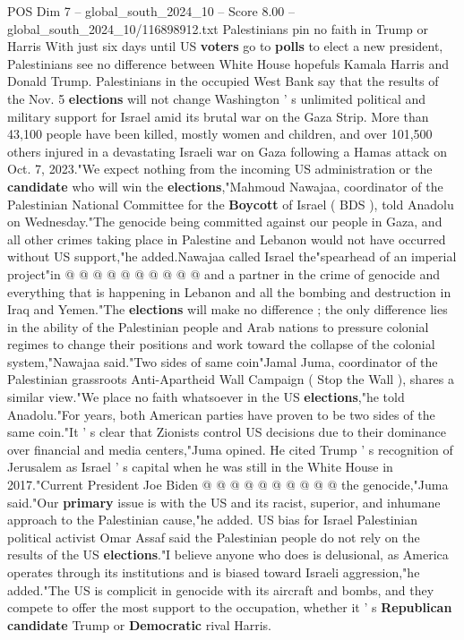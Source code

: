 \begin{textsample}{POS Dim 7 – global\_south\_2024\_10 – Score 8.00 – global\_south\_2024\_10/116898912.txt}  \label{ex:f7_pos_225}
Palestinians pin no faith in Trump or Harris With just six days until US \textbf{voters} go to \textbf{polls} to elect a new president, Palestinians see no difference between White House hopefuls Kamala Harris and Donald Trump.
Palestinians in the occupied West Bank say that the results of the Nov. 5 \textbf{elections} will not change Washington ' s unlimited political and military support for Israel amid its brutal war on the Gaza Strip.
More than 43,100 people have been killed, mostly women and children, and over 101,500 others injured in a devastating Israeli war on Gaza following a Hamas attack on Oct. 7, 2023."We expect nothing from the incoming US administration or the \textbf{candidate} who will win the \textbf{elections},"Mahmoud Nawajaa, coordinator of the Palestinian National Committee for the \textbf{Boycott} of Israel ( BDS ), told Anadolu on Wednesday."The genocide being committed against our people in Gaza, and all other crimes taking place in Palestine and Lebanon would not have occurred without US support,"he added.Nawajaa called Israel the"spearhead of an imperial project"in @ @ @ @ @ @ @ @ @ @ and a partner in the crime of genocide and everything that is happening in Lebanon and all the bombing and destruction in Iraq and Yemen."The \textbf{elections} will make no difference ; the only difference lies in the ability of the Palestinian people and Arab nations to pressure colonial regimes to change their positions and work toward the collapse of the colonial system,"Nawajaa said."Two sides of same coin"Jamal Juma, coordinator of the Palestinian grassroots Anti-Apartheid Wall Campaign ( Stop the Wall ), shares a similar view."We place no faith whatsoever in the US \textbf{elections},"he told Anadolu."For years, both American parties have proven to be two sides of the same coin."It ' s clear that Zionists control US decisions due to their dominance over financial and media centers,"Juma opined.
He cited Trump ' s recognition of Jerusalem as Israel ' s capital when he was still in the White House in 2017."Current President Joe Biden @ @ @ @ @ @ @ @ @ @ the genocide,"Juma said."Our \textbf{primary} issue is with the US and its racist, superior, and inhumane approach to the Palestinian cause,"he added.
US bias for Israel Palestinian political activist Omar Assaf said the Palestinian people do not rely on the results of the US \textbf{elections}."I believe anyone who does is delusional, as America operates through its institutions and is biased toward Israeli aggression,"he added."The US is complicit in genocide with its aircraft and bombs, and they compete to offer the most support to the occupation, whether it ' s \textbf{Republican} \textbf{candidate} Trump or \textbf{Democratic} rival Harris.

\end{textsample}
